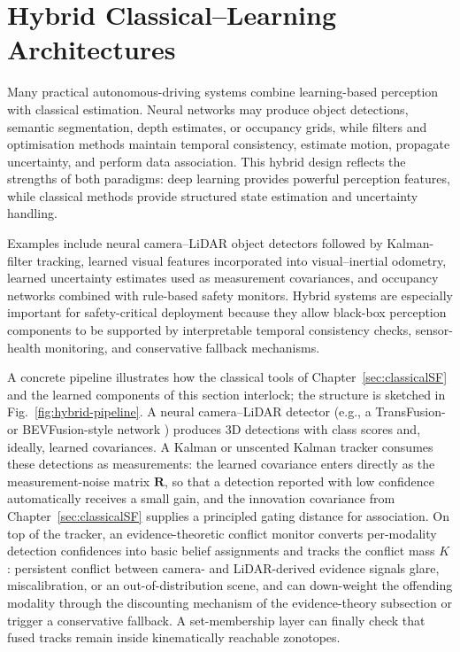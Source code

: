 \documentclass[graybox,envcountchap]{style/SNmono}
\begin{document}
\section{Hybrid Classical--Learning Architectures}


Many practical autonomous-driving systems combine learning-based perception with classical estimation. Neural networks may produce object detections, semantic segmentation, depth estimates, or occupancy grids, while filters and optimisation methods maintain temporal consistency, estimate motion, propagate uncertainty, and perform data association. This hybrid design reflects the strengths of both paradigms: deep learning provides powerful perception features, while classical methods provide structured state estimation and uncertainty handling.

Examples include neural camera--LiDAR object detectors followed by Kalman-filter tracking, learned visual features incorporated into visual--inertial odometry, learned uncertainty estimates used as measurement covariances, and occupancy networks combined with rule-based safety monitors. Hybrid systems are especially important for safety-critical deployment because they allow black-box perception components to be supported by interpretable temporal consistency checks, sensor-health monitoring, and conservative fallback mechanisms.


A concrete pipeline illustrates how the classical tools of Chapter~\ref{sec:classicalSF} and the learned components of this section interlock; the structure is sketched in Fig.~\ref{fig:hybrid-pipeline}. A neural camera--LiDAR detector (e.g., a TransFusion- or BEVFusion-style network \cite{bai2022_transfusion,liu2023_bevfusion}) produces 3D detections with class scores and, ideally, learned covariances. A Kalman or unscented Kalman tracker consumes these detections as measurements: the learned covariance enters directly as the measurement-noise matrix $\mathbf{R}$, so that a detection reported with low confidence automatically receives a small gain, and the innovation covariance from Chapter~\ref{sec:classicalSF} supplies a principled gating distance for association. On top of the tracker, an evidence-theoretic conflict monitor converts per-modality detection confidences into basic belief assignments and tracks the conflict mass $K$: persistent conflict between camera- and LiDAR-derived evidence signals glare, miscalibration, or an out-of-distribution scene, and can down-weight the offending modality through the discounting mechanism of the evidence-theory subsection or trigger a conservative fallback. A set-membership layer can finally check that fused tracks remain inside kinematically reachable zonotopes.
\end{document}
